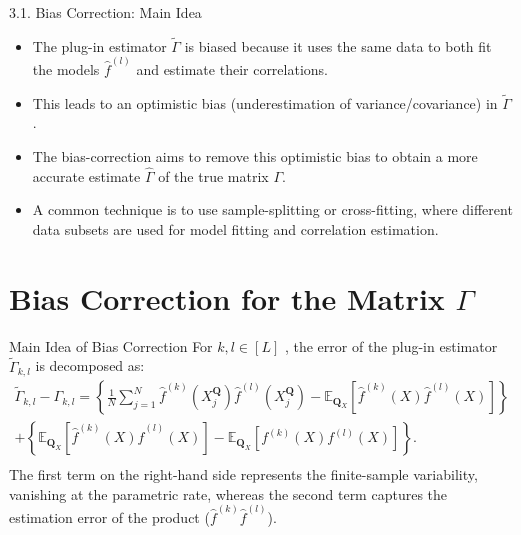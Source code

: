 \documentclass{beamer}
\begin{document}
\begin{frame}{3.1. Bias Correction: Main Idea}
    \begin{itemize}
        \item The plug-in estimator $\widetilde{\Gamma}$ is biased because it uses the same data to both fit the models $\widehat{f}^{(l)}$ and estimate their correlations.
        \item This leads to an optimistic bias (underestimation of variance/covariance) in $\widetilde{\Gamma}$.
        \item The bias-correction aims to remove this optimistic bias to obtain a more accurate estimate $\widehat{\Gamma}$ of the true matrix $\Gamma$.
        \item A common technique is to use sample-splitting or cross-fitting, where different data subsets are used for model fitting and correlation estimation.
    \end{itemize}
\end{frame}
\section{Bias Correction for the Matrix $\Gamma$}

\begin{frame}{Main Idea of Bias Correction}
    For $k , l \in [ L ]$ , the error of the plug-in estimator $\widetilde { \Gamma } _ { k , l }$ is decomposed as:
    $$
    \begin{array}{l} \widetilde {\Gamma} _ {k, l} - \Gamma_ {k, l} = \left\{\frac {1}{N} \sum_ {j = 1} ^ {N} \widehat {f} ^ {(k)} (X _ {j} ^ {\mathbf {Q}}) \widehat {f} ^ {(l)} (X _ {j} ^ {\mathbf {Q}}) - \mathbb {E} _ {\mathbf {Q} _ {X}} \left[ \widehat {f} ^ {(k)} (X) \widehat {f} ^ {(l)} (X) \right] \right\} \\ + \left\{\mathbb {E} _ {\mathbf {Q} _ {X}} \left[ \widehat {f} ^ {(k)} (X) \widehat {f} ^ {(l)} (X) \right] - \mathbb {E} _ {\mathbf {Q} _ {X}} \left[ f ^ {(k)} (X) f ^ {(l)} (X) \right] \right\}. \\ \end{array}
    $$
    The first term on the right-hand side represents the finite-sample variability, vanishing at the parametric rate, whereas the second term captures the estimation error of the product ($\widehat { f } ^ { ( k ) } \widehat { f } ^ { ( l ) }$).
\end{frame}
\end{document}
